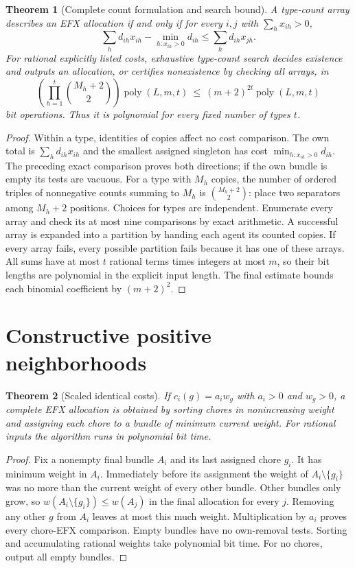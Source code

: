 \documentclass[11pt]{article}
\newtheorem{theorem}{Theorem}
\theoremstyle{definition}
\begin{document}
\begin{theorem}[Complete count formulation and search bound]
A type-count array describes an EFX allocation if and only if for every $i,j$
with $\sum_hx_{ih}>0$,
\[
 \sum_h d_{ih}x_{ih}-\min_{h:x_{ih}>0}d_{ih}
 \leq \sum_h d_{ih}x_{jh}.
\]
For rational explicitly listed costs, exhaustive type-count search decides
existence and outputs an allocation, or certifies nonexistence by checking all
arrays, in
\[
 \left(\prod_{h=1}^t {M_h+2\choose2}\right)\operatorname{poly}(L,m,t)
 \ \leq\ (m+2)^{2t}\operatorname{poly}(L,m,t)
\]
bit operations. Thus it is polynomial for every fixed number of types $t$.
\end{theorem}
\begin{proof}
Within a type, identities of copies affect no cost comparison. The own total
is $\sum_hd_{ih}x_{ih}$ and the smallest assigned singleton has cost
$\min_{h:x_{ih}>0}d_{ih}$. The preceding exact comparison proves both directions;
if the own bundle is empty its tests are vacuous.
For a type with $M_h$ copies, the number of ordered triples of nonnegative
counts summing to $M_h$ is ${M_h+2\choose2}$: place two separators among
$M_h+2$ positions. Choices for types are independent. Enumerate every array
and check its at most nine comparisons by exact arithmetic. A successful array
is expanded into a partition by handing each agent its counted copies.
If every array fails, every possible partition fails because it has one of
these arrays. All sums have at most $t$ rational terms times integers at most
$m$, so their bit lengths are polynomial in the explicit input length.
The final estimate bounds each binomial coefficient by $(m+2)^2$.
\end{proof}

\section{Constructive positive neighborhoods}
\begin{theorem}[Scaled identical costs]
If $c_i(g)=a_iw_g$ with $a_i>0$ and $w_g>0$, a complete EFX allocation is
obtained by sorting chores in nonincreasing weight and assigning each chore
to a bundle of minimum current weight. For rational inputs the algorithm
runs in polynomial bit time.
\end{theorem}
\begin{proof}
Fix a nonempty final bundle $A_i$ and its last assigned chore $g_i$.
It has minimum weight in $A_i$. Immediately before its assignment the weight
of $A_i\setminus\{g_i\}$ was no more than the current weight of every other
bundle. Other bundles only grow, so
$w(A_i\setminus\{g_i\})\leq w(A_j)$ in the final allocation for every $j$.
Removing any other $g$ from $A_i$ leaves at most this much weight.
Multiplication by $a_i$ proves every chore-EFX comparison. Empty bundles
have no own-removal tests. Sorting and accumulating rational weights take
polynomial bit time. For no chores, output all empty bundles.
\end{proof}
\end{document}
